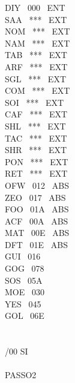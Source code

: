 \documentclass[a4paper,12pt]{article}
\begin{document}
\noindent DIY \ 000 \ ENT\\
SAA \ *** \ EXT\\
NOM \ *** \ EXT\\
NAM \ *** \ EXT\\
TAB \ *** \ EXT\\
ARF \ *** \ EXT\\
SGL \ *** \ EXT\\
COM \ *** \ EXT\\
SOI \ *** \ EXT\\
CAF \ *** \ EXT\\
SHL \ *** \ EXT\\
TAC \ *** \ EXT\\
SHR \ *** \ EXT\\
PON \ *** \ EXT\\
RET \ *** \ EXT\\
OFW \ 012 \ ABS\\
ZEO \ 017 \ ABS\\
FOO \ 01A \ ABS\\
ACF \ 00A \ ABS\\
MAT \ 00E \ ABS\\
DFT \ 01E \ ABS\\
GUI \ 016\\
GOG \ 078\\
SOS \ 05A\\
MOE \ 030\\
YES \ 045\\
GOL \ 06E\\
\\
\\
/00 SI\\
\\
PASSO2

\newpage
\end{document}

